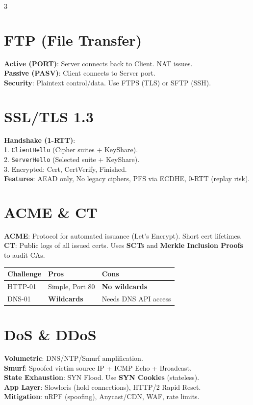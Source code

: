 \documentclass[10pt,landscape]{article}
\begin{document}
\begin{multicols*}{3}
\section*{FTP (File Transfer)}
\textbf{Active (PORT)}: Server connects back to Client. NAT issues. \\
\textbf{Passive (PASV)}: Client connects to Server port. \\
\textbf{Security}: Plaintext control/data. Use FTPS (TLS) or SFTP (SSH).

\section*{SSL/TLS 1.3}
\textbf{Handshake (1-RTT)}: \\
1. \texttt{ClientHello} (Cipher suites + KeyShare). \\
2. \texttt{ServerHello} (Selected suite + KeyShare). \\
3. Encrypted: Cert, CertVerify, Finished. \\
\textbf{Features}: AEAD only, No legacy ciphers, PFS via ECDHE, 0-RTT (replay risk).

\section*{ACME \& CT}
\textbf{ACME}: Protocol for automated issuance (Let's Encrypt). Short cert lifetimes. \textbf{CT}: Public logs of all issued certs. Uses \textbf{SCTs} and \textbf{Merkle Inclusion Proofs} to audit CAs. \\
\begin{tabular}{@{}lp{1.5cm}p{2cm}@{}}
\toprule
Challenge & Pros & Cons \\ \midrule
HTTP-01 & Simple, Port 80 & \textbf{No wildcards} \\
DNS-01 & \textbf{Wildcards} & Needs DNS API access \\ \bottomrule
\end{tabular}

\section*{DoS \& DDoS}
\textbf{Volumetric}: DNS/NTP/Smurf amplification. \\
\textbf{Smurf}: Spoofed victim source IP + ICMP Echo + Broadcast. \\
\textbf{State Exhaustion}: SYN Flood. Use \textbf{SYN Cookies} (stateless). \\
\textbf{App Layer}: Slowloris (hold connections), HTTP/2 Rapid Reset. \\
\textbf{Mitigation}: uRPF (spoofing), Anycast/CDN, WAF, rate limits.


\end{multicols*}
\end{document}
